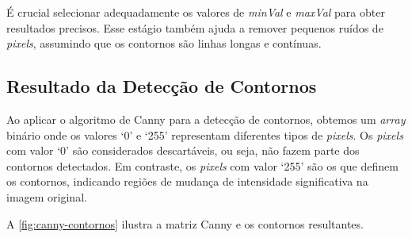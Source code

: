 
É crucial selecionar adequadamente os valores de \textit{minVal} e \textit{maxVal} para obter resultados precisos. Esse estágio também ajuda a remover pequenos ruídos de \textit{pixels}, assumindo que os contornos são linhas longas e contínuas.

\subsection{Resultado da Detecção de Contornos}
\label{sec:resultado-deteccao-contornos}

Ao aplicar o algoritmo de Canny para a detecção de contornos, obtemos um \textit{array} binário onde os valores `0' e `255' representam diferentes tipos de \textit{pixels}. Os \textit{pixels} com valor `0' são considerados descartáveis, ou seja, não fazem parte dos contornos detectados. Em contraste, os \textit{pixels} com valor `255' são os que definem os contornos, indicando regiões de mudança de intensidade significativa na imagem original.

A \autoref{fig:canny-contornos} ilustra a matriz Canny e os contornos resultantes.

